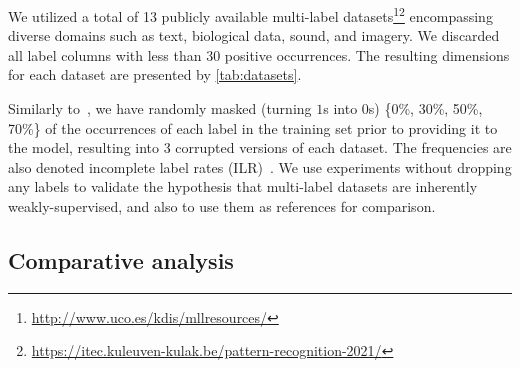 \documentclass[conference,compsoc]{IEEEtran}
\begin{document}
\begin{table}[htbp]
    \caption{
        Datasets overview. %
    }
    \label{tab:datasets}
\end{table}

We utilized a total of 13 publicly available multi-label datasets\footnote{\url{http://www.uco.es/kdis/mllresources/}}\footnote{\url{https://itec.kuleuven-kulak.be/pattern-recognition-2021/}} encompassing diverse domains such as text, biological data, sound, and imagery. We discarded all label columns with less than 30 positive occurrences. The resulting dimensions for each dataset are presented by \autoref{tab:datasets}.

Similarly to~\cite{wang2020learning}, we have randomly masked (turning $1$s into $0$s) \{0\%, 30\%, 50\%, 70\%\} of the occurrences of each label in the training set prior to providing it to the model, resulting into 3 corrupted versions of each dataset. The frequencies are also denoted incomplete label rates (ILR)~\cite{wang2020learning}. %
%
We use experiments without dropping any labels to validate the hypothesis that multi-label datasets are inherently weakly-supervised, and also to use them as references for comparison.



\subsection{Comparative analysis}
\end{document}
